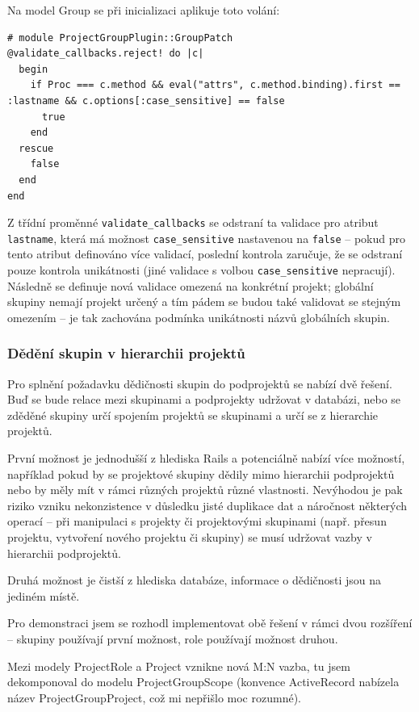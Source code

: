 \documentclass[thesis=B,czech]{FITthesis}[2012/05/02]
\begin{document}
Na model Group se při inicializaci aplikuje toto volání:

\begin{lstlisting}
# module ProjectGroupPlugin::GroupPatch
@validate_callbacks.reject! do |c|
  begin
    if Proc === c.method && eval("attrs", c.method.binding).first == :lastname && c.options[:case_sensitive] == false
      true
    end
  rescue
    false
  end
end
\end{lstlisting}
Z třídní proměnné \lstinline!validate_callbacks! se odstraní ta validace
pro atribut \lstinline!lastname!, která má možnost
\lstinline!case_sensitive! nastavenou na \lstinline!false! -- pokud pro
tento atribut definováno více validací, poslední kontrola zaručuje, že
se odstraní pouze kontrola unikátnosti (jiné validace s volbou
\lstinline!case_sensitive! nepracují). Následně se definuje nová
validace omezená na konkrétní projekt; globální skupiny nemají projekt
určený a tím pádem se budou také validovat se stejným omezením -- je tak
zachována podmínka unikátnosti názvů globálních skupin.

\subsubsection{Dědění skupin v hierarchii projektů}
\label{sec:proj_group_inherit}

Pro splnění požadavku dědičnosti skupin do podprojektů se nabízí dvě
řešení. Buď se bude relace mezi skupinami a podprojekty udržovat
v databázi, nebo se zděděné skupiny určí spojením projektů se skupinami a
určí se z hierarchie projektů.

První možnost je jednodušší z hlediska Rails a potenciálně nabízí více
možností, například pokud by se projektové skupiny dědily mimo
hierarchii podprojektů nebo by měly mít v rámci různých projektů různé
vlastnosti. Nevýhodou je pak riziko vzniku nekonzistence v důsledku
jisté duplikace dat a náročnost některých operací -- při manipulaci
s projekty či projektovými skupinami (např. přesun projektu, vytvoření
nového projektu či skupiny) se musí udržovat vazby v hierarchii
podprojektů.

Druhá možnost je čistší z hlediska databáze, informace o dědičnosti jsou
na jediném místě.

Pro demonstraci jsem se rozhodl implementovat obě řešení v rámci dvou
rozšíření -- skupiny používají první možnost, role používají možnost
druhou.

Mezi modely ProjectRole a Project vznikne nová M:N vazba, tu jsem
dekomponoval do modelu ProjectGroupScope (konvence ActiveRecord nabízela
název ProjectGroupProject, což mi nepřišlo moc rozumné).
\end{document}
